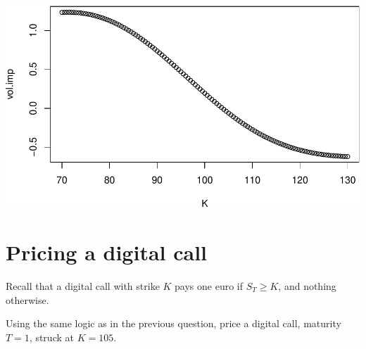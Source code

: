 \documentclass[
]{article}
\begin{document}
\includegraphics{TP-VannaVolga_files/figure-latex/unnamed-chunk-10-1.pdf}

\hypertarget{pricing-a-digital-call}{%
\section{Pricing a digital call}\label{pricing-a-digital-call}}

Recall that a digital call with strike \(K\) pays one euro if
\(S_T \geq K\), and nothing otherwise.

Using the same logic as in the previous question, price a digital call,
maturity \(T=1\), struck at \(K=105\).
\end{document}
